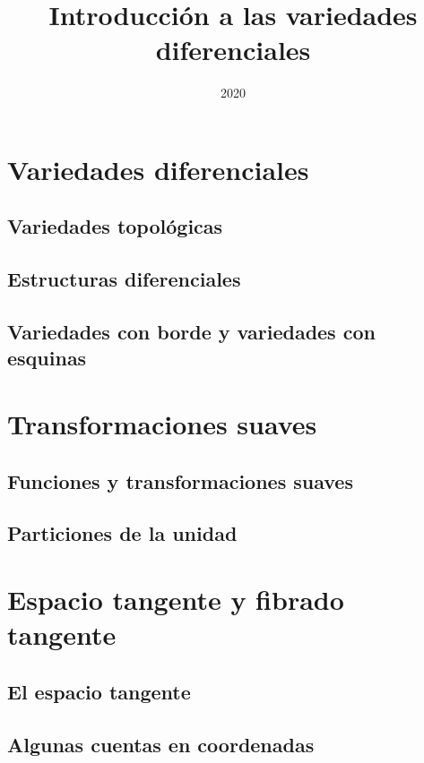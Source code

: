 \documentclass[11pt]{report}
\title{Introducci\'{o}n a las variedades diferenciales}
\author{}
\date{2020} %
\begin{document}
\maketitle


\chapter{Variedades diferenciales}
\section{Variedades topol\'{o}gicas}

%
\section{Estructuras diferenciales}

%
\section{Variedades con borde y variedades con esquinas}

%


\chapter{Transformaciones suaves}
\section{Funciones y transformaciones suaves}

%
\section{Particiones de la unidad}

%


\chapter{Espacio tangente y fibrado tangente}
\section{El espacio tangente}

%
\section{Algunas cuentas en coordenadas}

%
\end{document}
